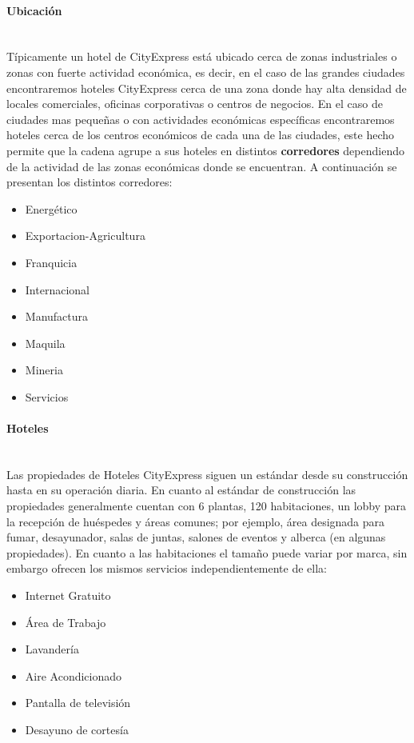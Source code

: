 \documentclass[a4paper,11pt]{article}
\begin{document}
\paragraph {Ubicación} ~ \\
Típicamente un hotel de CityExpress está ubicado cerca de zonas industriales o zonas con fuerte actividad económica, es decir, en el caso de las grandes ciudades encontraremos hoteles CityExpress cerca de una zona donde hay alta densidad de locales comerciales, oficinas corporativas o centros de negocios. En el caso de ciudades mas pequeñas o con actividades económicas específicas encontraremos hoteles cerca de los centros económicos de cada una de las ciudades, este hecho permite que la cadena agrupe a sus hoteles en distintos \textbf{corredores} dependiendo de la actividad de las zonas económicas donde se encuentran. A continuación se presentan los distintos corredores:
\begin{itemize}[noitemsep]
\item Energético
\item Exportacion-Agricultura
\item Franquicia
\item Internacional
\item Manufactura
\item Maquila
\item Mineria
\item Servicios
\end{itemize}
\paragraph {Hoteles} ~ \\
Las propiedades de Hoteles CityExpress siguen un estándar desde su construcción hasta en su operación diaria. En cuanto al estándar de construcción las propiedades generalmente cuentan con 6 plantas, 120 habitaciones, un lobby para la recepción de huéspedes y áreas comunes; por ejemplo, área designada para fumar, desayunador, salas de juntas, salones de eventos y alberca (en algunas propiedades). 
En cuanto a las habitaciones el tamaño puede variar por marca, sin embargo ofrecen los mismos servicios independientemente de ella: 
\begin{itemize}[noitemsep]
\item Internet Gratuito
\item Área de Trabajo
\item Lavandería
\item Aire Acondicionado
\item Pantalla de televisión
\item Desayuno de cortesía
\end{itemize}
\end{document}
